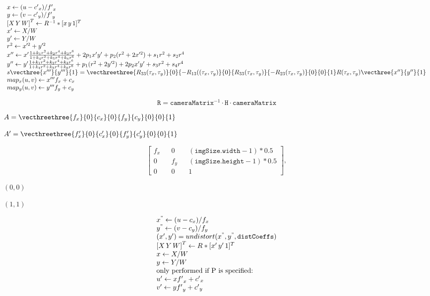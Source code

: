 \documentclass{article}
\begin{document}
\[ \begin{array}{l} x \leftarrow (u - {c'}_x)/{f'}_x \\ y \leftarrow (v - {c'}_y)/{f'}_y \\ {[X\,Y\,W]} ^T \leftarrow R^{-1}*[x \, y \, 1]^T \\ x' \leftarrow X/W \\ y' \leftarrow Y/W \\ r^2 \leftarrow x'^2 + y'^2 \\ x'' \leftarrow x' \frac{1 + k_1 r^2 + k_2 r^4 + k_3 r^6}{1 + k_4 r^2 + k_5 r^4 + k_6 r^6} + 2p_1 x' y' + p_2(r^2 + 2 x'^2) + s_1 r^2 + s_2 r^4\\ y'' \leftarrow y' \frac{1 + k_1 r^2 + k_2 r^4 + k_3 r^6}{1 + k_4 r^2 + k_5 r^4 + k_6 r^6} + p_1 (r^2 + 2 y'^2) + 2 p_2 x' y' + s_3 r^2 + s_4 r^4 \\ s\vecthree{x'''}{y'''}{1} = \vecthreethree{R_{33}(\tau_x, \tau_y)}{0}{-R_{13}((\tau_x, \tau_y)} {0}{R_{33}(\tau_x, \tau_y)}{-R_{23}(\tau_x, \tau_y)} {0}{0}{1} R(\tau_x, \tau_y) \vecthree{x''}{y''}{1}\\ map_x(u,v) \leftarrow x''' f_x + c_x \\ map_y(u,v) \leftarrow y''' f_y + c_y \end{array} \]
\pagebreak

\[\texttt{R} = \texttt{cameraMatrix} ^{-1} \cdot \texttt{H} \cdot \texttt{cameraMatrix}\]
\pagebreak

$A=\vecthreethree{f_x}{0}{c_x}{0}{f_y}{c_y}{0}{0}{1}$
\pagebreak

$A'=\vecthreethree{f_x'}{0}{c_x'}{0}{f_y'}{c_y'}{0}{0}{1}$
\pagebreak

\[\begin{bmatrix} f_x && 0 && ( \texttt{imgSize.width} -1)*0.5 \\ 0 && f_y && ( \texttt{imgSize.height} -1)*0.5 \\ 0 && 0 && 1 \end{bmatrix} ,\]
\pagebreak

$(0,0)$
\pagebreak

$(1,1)$
\pagebreak

\[ \begin{array}{l} x^{"} \leftarrow (u - c_x)/f_x \\ y^{"} \leftarrow (v - c_y)/f_y \\ (x',y') = undistort(x^{"},y^{"}, \texttt{distCoeffs}) \\ {[X\,Y\,W]} ^T \leftarrow R*[x' \, y' \, 1]^T \\ x \leftarrow X/W \\ y \leftarrow Y/W \\ \text{only performed if P is specified:} \\ u' \leftarrow x {f'}_x + {c'}_x \\ v' \leftarrow y {f'}_y + {c'}_y \end{array} \]
\pagebreak
\end{document}
